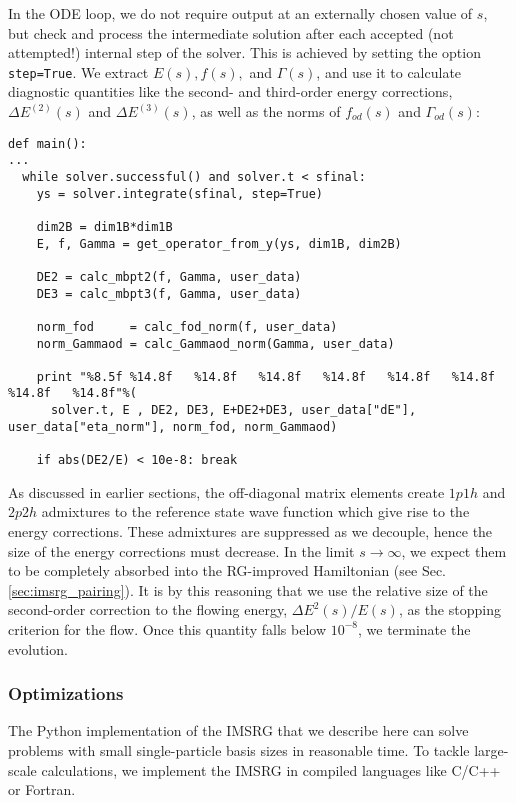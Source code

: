 In the ODE loop, we do not require output at an externally chosen
value of $s$, but check and process the intermediate solution after
each accepted (not attempted!) internal step of the solver. This is
achieved by setting the option \texttt{step=True}. We extract 
$E(s), f(s),$ and $\Gamma(s)$, and use it to calculate diagnostic
quantities like the second- and third-order energy corrections, 
$\Delta E^{(2)}(s)$ and $\Delta E^{(3)}(s)$, as well as the norms 
of $f_{od}(s)$ and $\Gamma_{od}(s)$:  
\begin{lstlisting}
def main():
...
  while solver.successful() and solver.t < sfinal:
    ys = solver.integrate(sfinal, step=True)
    
    dim2B = dim1B*dim1B
    E, f, Gamma = get_operator_from_y(ys, dim1B, dim2B)

    DE2 = calc_mbpt2(f, Gamma, user_data)
    DE3 = calc_mbpt3(f, Gamma, user_data)

    norm_fod     = calc_fod_norm(f, user_data)
    norm_Gammaod = calc_Gammaod_norm(Gamma, user_data)

    print "%8.5f %14.8f   %14.8f   %14.8f   %14.8f   %14.8f   %14.8f   %14.8f   %14.8f"%(
      solver.t, E , DE2, DE3, E+DE2+DE3, user_data["dE"], user_data["eta_norm"], norm_fod, norm_Gammaod)

    if abs(DE2/E) < 10e-8: break

\end{lstlisting}
As discussed in earlier sections, the off-diagonal matrix elements 
create $1p1h$ and $2p2h$ admixtures to the reference state wave function 
which give rise to the energy corrections. These admixtures are suppressed
as we decouple, hence the size of the energy corrections must decrease.
In the limit $s\to\infty$, we expect them to be completely absorbed into
the RG-improved Hamiltonian (see Sec.\ref{sec:imsrg_pairing}). It is
by this reasoning that we use the relative size of the second-order correction
to the flowing energy, $\Delta E^2(s)/E(s)$, as the stopping criterion for
the flow. Once this quantity falls below $10^{-8}$, we terminate the evolution.

\subsubsection*{Optimizations}
The Python implementation of the IMSRG that we describe here can solve
problems with small single-particle basis sizes in reasonable time. To 
tackle large-scale calculations, we implement the IMSRG in compiled
languages like C/C++ or Fortran.


